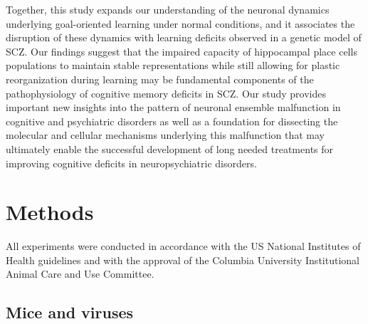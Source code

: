 Together, this study expands our understanding of the neuronal dynamics underlying goal-oriented learning under normal conditions, and it associates the disruption of these dynamics with learning deficits observed in a genetic model of SCZ. Our findings suggest that the impaired capacity of hippocampal place cells populations to maintain stable representations while still allowing for plastic reorganization during learning may be fundamental components of the pathophysiology of cognitive memory deficits in SCZ. Our study provides important new insights into the pattern of neuronal ensemble malfunction in cognitive and psychiatric disorders as well as a foundation for dissecting the molecular and cellular mechanisms underlying this malfunction that may ultimately enable the successful development of long needed treatments for improving cognitive deficits in neuropsychiatric disorders.

\section{Methods}

All experiments were conducted in accordance with the US National Institutes of Health guidelines and with the approval of the Columbia University Institutional Animal Care and Use Committee.

\subsection{Mice and viruses}

